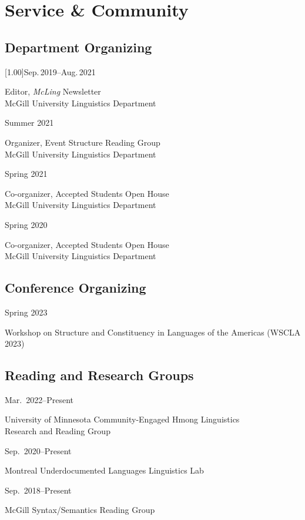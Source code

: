 \documentclass[11pt,oneside,DIV=8,parskip=off,letterpaper]{scrarticle} %
\newlength{\leftcolwidth}
\newlength{\mycolspace}
\newlength{\rightcolwidth}
\newlength{\spacingbefore}
\newlength{\spacingafter}
\newcommand{\mytwocol}[2]{%
	\vspace{\spacingbefore}%
	\begin{minipage}[t]{\leftcolwidth}%
		\strut#1%
	\end{minipage}%
	\hspace{\mycolspace}%
	\begin{minipage}[t]{\rightcolwidth}%
		\strut#2%
	\end{minipage}%
	\vspace{\spacingafter}\par%
	}
\newcommand{\cvline}[2]{%
	\mytwocol{#1}{#2}%
	}
\begin{document}

\section{Service \& Community}

\subsection{Department Organizing}
\cvline{\scalebox{.97}[1.00]{Sep.\,2019--Aug.\,2021}}{Editor, \textit{McLing} Newsletter\\McGill University Linguistics Department}

\cvline{Summer 2021}{Organizer, Event Structure Reading Group\\McGill University Linguistics Department}

\cvline{Spring 2021}{Co-organizer, Accepted Students Open House\\McGill University Linguistics Department}

\cvline{Spring 2020}{Co-organizer, Accepted Students Open House\\McGill University Linguistics Department}

\subsection{Conference Organizing}
\cvline{Spring 2023}{Workshop on Structure and Constituency in Languages of the Americas (WSCLA 2023)}

\subsection{Reading and Research Groups}

\cvline{Mar.\ 2022--Present}{University of Minnesota Community-Engaged Hmong Linguistics\\Research and Reading Group}

\cvline{Sep.\ 2020--Present}{Montreal Underdocumented Languages Linguistics Lab}

\cvline{Sep.\ 2018--Present}{McGill Syntax/Semantics Reading Group}
\end{document}
